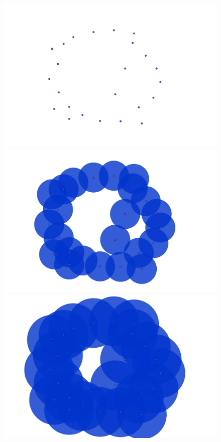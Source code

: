\documentclass[12pt,a4paper,twoside]{article} %
\theoremstyle{plain}
\theoremstyle{definition}
\begin{document}
\begin{figure}[h!]
\centering
\includegraphics[scale=0.25]{img/cloud002.png}
\includegraphics[scale=0.25]{img/cloud152.png} \\
\includegraphics[scale=0.25]{img/cloud252.png}

\end{figure}
\end{document}
